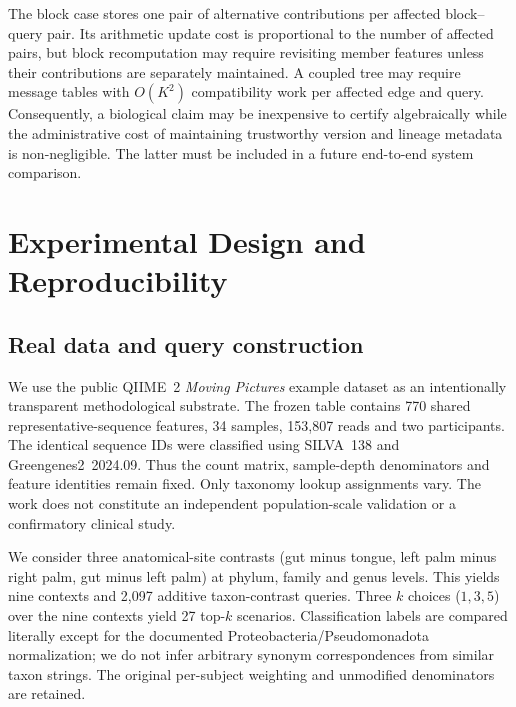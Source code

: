 \documentclass[conference]{IEEEtran}
\begin{document}
The block case stores one pair of alternative contributions per affected block--query pair. Its arithmetic update cost is proportional to the number of affected pairs, but block recomputation may require revisiting member features unless their contributions are separately maintained. A coupled tree may require message tables with $O(K^2)$ compatibility work per affected edge and query. Consequently, a biological claim may be inexpensive to certify algebraically while the administrative cost of maintaining trustworthy version and lineage metadata is non-negligible. The latter must be included in a future end-to-end system comparison.

\section{Experimental Design and Reproducibility}
\label{sec:exp}
\subsection{Real data and query construction}
We use the public QIIME~2 \emph{Moving Pictures} example dataset \cite{bolyen2019} as an intentionally transparent methodological substrate. The frozen table contains 770 shared representative-sequence features, 34 samples, 153,807 reads and two participants. The identical sequence IDs were classified using SILVA~138 and Greengenes2~2024.09. Thus the count matrix, sample-depth denominators and feature identities remain fixed. Only taxonomy lookup assignments vary. The work does not constitute an independent population-scale validation or a confirmatory clinical study.

We consider three anatomical-site contrasts (gut minus tongue, left palm minus right palm, gut minus left palm) at phylum, family and genus levels. This yields nine contexts and 2,097 additive taxon-contrast queries. Three $k$ choices ($1,3,5$) over the nine contexts yield 27 top-$k$ scenarios. Classification labels are compared literally except for the documented Proteobacteria/Pseudomonadota normalization; we do not infer arbitrary synonym correspondences from similar taxon strings. The original per-subject weighting and unmodified denominators are retained.
\end{document}
